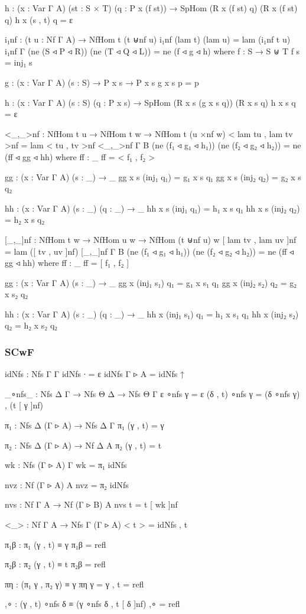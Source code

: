 \begin{code}
  h : (x : Var Γ A) (st : S × T) (q : P x (f st)) → SpHom (R x (f st) q) (R x (f st) q)
  h x (s , t) q = ε

i₁nf : (t u : Nf Γ A) → NfHom t (t ⊎nf u)
i₁nf (lam t) (lam u) = lam (i₁nf t u)
i₁nf {Γ} (ne (S ◃ P ◃ R)) (ne (T ◃ Q ◃ L)) = ne (f ◃ g ◃ h)
  where
  f : S → S ⊎ T
  f s = inj₁ s

  g : (x : Var Γ A) (s : S) → P x s → P x s
  g x s p = p

  h : (x : Var Γ A) (s : S) (q : P x s) → SpHom (R x s (g x s q)) (R x s q)
  h x s q = ε

<_,_>nf : NfHom t u → NfHom t w → NfHom t (u ×nf w)
< lam tu , lam tv >nf = lam < tu , tv >nf
<_,_>nf {Γ} {B} (ne (f₁ ◃ g₁ ◃ h₁)) (ne (f₂ ◃ g₂ ◃ h₂)) = ne (ff ◃ gg ◃ hh)
  where
  ff : _
  ff = < f₁ , f₂ >

  gg : (x : Var Γ A) (s : _) → _
  gg x s (inj₁ q₁) = g₁ x s q₁
  gg x s (inj₂ q₂) = g₂ x s q₂

  hh : (x : Var Γ A) (s : _) (q : _) → _
  hh x s (inj₁ q₁) = h₁ x s q₁
  hh x s (inj₂ q₂) = h₂ x s q₂

[_,_]nf : NfHom t w → NfHom u w → NfHom (t ⊎nf u) w
[ lam tv , lam uv ]nf = lam ([ tv , uv ]nf)
[_,_]nf {Γ} {B} (ne (f₁ ◃ g₁ ◃ h₁)) (ne (f₂ ◃ g₂ ◃ h₂)) = ne (ff ◃ gg ◃ hh)
  where
  ff : _
  ff = [ f₁ , f₂ ]

  gg : (x : Var Γ A) (s : _) → _
  gg x (inj₁ s₁) q₁ = g₁ x s₁ q₁
  gg x (inj₂ s₂) q₂ = g₂ x s₂ q₂

  hh : (x : Var Γ A) (s : _) (q : _) → _
  hh x (inj₁ s₁) q₁ = h₁ x s₁ q₁
  hh x (inj₂ s₂) q₂ = h₂ x s₂ q₂
\end{code}

\subsubsection*{SCwF}\label{SCwF}

\begin{code}
idNfs : Nfs Γ Γ
idNfs {∙} = ε
idNfs {Γ ▹ A} = idNfs ↑

_∘nfs_ : Nfs Δ Γ → Nfs Θ Δ → Nfs Θ Γ
ε ∘nfs γ = ε
(δ , t) ∘nfs γ = (δ ∘nfs γ) , (t [ γ ]nf)

π₁ : Nfs Δ (Γ ▹ A) → Nfs Δ Γ
π₁ (γ , t) = γ

π₂ : Nfs Δ (Γ ▹ A) → Nf Δ A
π₂ (γ , t) = t

wk : Nfs (Γ ▹ A) Γ
wk = π₁ idNfs

nvz : Nf (Γ ▹ A) A
nvz = π₂ idNfs

nvs : Nf Γ A → Nf (Γ ▹ B) A
nvs t = t [ wk ]nf

<_> : Nf Γ A → Nfs Γ (Γ ▹ A)
< t > = idNfs , t

π₁β : π₁ (γ , t) ≡ γ
π₁β = refl

π₂β : π₂ (γ , t) ≡ t
π₂β = refl

πη : (π₁ γ , π₂ γ) ≡ γ
πη {γ = γ , t} = refl

,∘ : (γ , t) ∘nfs δ ≡ (γ ∘nfs δ , t [ δ ]nf)
,∘ = refl
\end{code}

